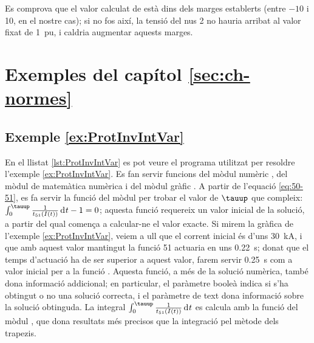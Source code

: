 Es comprova que el valor calculat de  està dins dels marges establerts (entre $-10$ i 10, en el nostre cas); si no fos així, la tensió del nus 2 no hauria arribat al valor fixat de \qty{1}{pu}, i caldria augmentar aquests marges.


\section{Exemples del capítol \ref*{sec:ch-normes}}

\hypertarget{exemple:ProtInvIntVar}{\subsection{Exemple \ref*{ex:ProtInvIntVar} \ProtInvIntVar}}
En el llistat \vref{lst:ProtInvIntVar} es pot veure el programa utilitzat per resoldre l'exemple \vref{ex:ProtInvIntVar}. Es fan servir funcions  del mòdul numèric , del mòdul de matemàtica numèrica  i del mòdul gràfic . A partir de l'equació \eqref{eq:50-51}, es fa servir la funció   del mòdul  per trobar el valor de $\tauup$ que compleix: $\int_0^\tauup \frac{1}{t_{51}(I(t))}  \diff t - 1 = 0$; aquesta  funció requereix un valor inicial de la solució, a partir del qual comença a calcular-ne el valor exacte. Si mirem la gràfica de l'exemple \ref{ex:ProtInvIntVar}, veiem a ull que el corrent inicial és d'uns \qty{30}{kA}, i que amb aquest valor mantingut la funció 51 actuaria en uns \qty{0,22}{s}; donat que el temps d'actuació ha de ser superior a aquest valor, farem servir \qty{0,25}{s} com a valor inicial per a la funció . Aquesta funció, a més de la solució numèrica, també  dona informació addicional; en particular, el paràmetre booleà  indica si s'ha obtingut o no una solució correcta, i el  paràmetre de text   dona informació sobre la solució obtinguda. La integral $\int_0^\tauup \frac{1}{t_{51}(I(t))}  \diff t$ es calcula amb la funció  del mòdul , que dona resultats més precisos que la integració pel mètode dels trapezis. 


